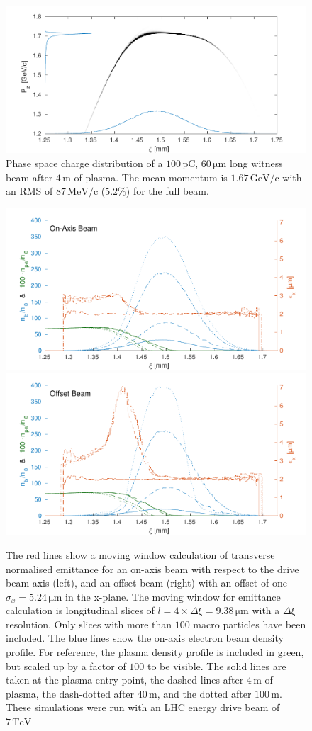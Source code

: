 \documentclass[aps,prstab,reprint,amsmath,amssymb,groupedaddress]{revtex4-1}
\newcommand{\unit}[1]{\,\mathrm{#1}}
\begin{document}
\begin{figure}[hbt]
    \includegraphics[width=\linewidth,trim={2mm 0mm 2mm 0mm},clip]{figures/beamPhaseSpace}
    \caption{\label{Fig:BeamPS} Phase space charge distribution of a $100\unit{pC}$, $60\unit{\mu m}$ long witness beam
        after $4\unit{m}$ of plasma. The mean momentum is $1.67\unit{GeV/c}$ with an RMS of $87\unit{MeV/c}$ ($5.2\%$){}
        for the full beam.}
\end{figure}

\begin{figure}[hbt]
    \includegraphics[width=0.495\linewidth,trim={2mm 0mm 2mm 0mm},clip]{figures/beamEmittance}
    \includegraphics[width=0.495\linewidth,trim={2mm 0mm 2mm 0mm},clip]{figures/beamEmittanceOffset}
    \caption{\label{Fig:BeamEmitt} The red lines show a moving window calculation of transverse normalised emittance for
        an on-axis beam with respect to the drive beam axis (left), and an offset beam (right) with an offset of one
        $\sigma_{x} = 5.24\unit{\mu m}$ in the x-plane. The moving window for emittance calculation is longitudinal
        slices of $l = 4\times\Delta\xi = 9.38\unit{\mu m}$ with a $\Delta\xi$ resolution. Only slices with more than
        $100$ macro particles have been included. The blue lines show the on-axis electron beam density profile. For
        reference, the plasma density profile is included in green, but scaled up by a factor of $100$ to be visible.
        The solid lines are taken at the plasma entry point, the dashed lines after $4\unit{m}$ of plasma, the
        dash-dotted after $40\unit{m}$, and the dotted after $100\unit{m}$. These simulations were run with an LHC
        energy drive beam of $7\unit{TeV}$}
\end{figure}
\end{document}
